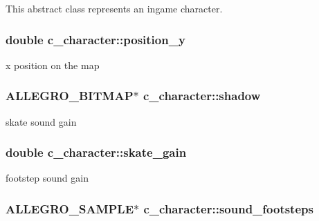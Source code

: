 This abstract class represents an ingame character. \hypertarget{classc__character_a9d37196174588bc6ee1593a2f6c98244}{
\subsubsection[{position\-\_\-y}]{\setlength{\rightskip}{0pt plus 5cm}double c\-\_\-character\-::position\-\_\-y\hspace{0.3cm}{\ttfamily [protected]}}}\label{classc__character_a9d37196174588bc6ee1593a2f6c98244}
x position on the map \hypertarget{classc__character_a7bddca76d4c38008b127fa0d3ea36738}{
\subsubsection[{shadow}]{\setlength{\rightskip}{0pt plus 5cm}A\-L\-L\-E\-G\-R\-O\-\_\-\-B\-I\-T\-M\-A\-P$\ast$ c\-\_\-character\-::shadow\hspace{0.3cm}{\ttfamily [protected]}}}\label{classc__character_a7bddca76d4c38008b127fa0d3ea36738}
skate sound gain \hypertarget{classc__character_addf8133a5a8cf4ce83405e5a1335fdfd}{
\subsubsection[{skate\-\_\-gain}]{\setlength{\rightskip}{0pt plus 5cm}double c\-\_\-character\-::skate\-\_\-gain\hspace{0.3cm}{\ttfamily [protected]}}}\label{classc__character_addf8133a5a8cf4ce83405e5a1335fdfd}
footstep sound gain \hypertarget{classc__character_af944a0456aa0fdb9720b1dd2b9b4e235}{
\subsubsection[{sound\-\_\-footsteps}]{\setlength{\rightskip}{0pt plus 5cm}A\-L\-L\-E\-G\-R\-O\-\_\-\-S\-A\-M\-P\-L\-E$\ast$ c\-\_\-character\-::sound\-\_\-footsteps\hspace{0.3cm}{\ttfamily [protected]}}}\label{classc__character_af944a0456aa0fdb9720b1dd2b9b4e235}
